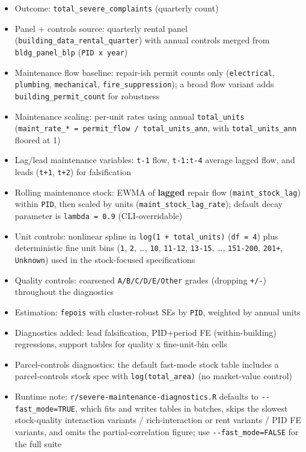 \documentclass[
  11pt,
]{article}
\providecommand{\tightlist}{%
  \setlength{\itemsep}{0pt}\setlength{\parskip}{0pt}}
\begin{document}
\begin{itemize}
\tightlist
\item
  Outcome: \texttt{total\_severe\_complaints} (quarterly count)
\item
  Panel + controls source: quarterly rental panel
  (\texttt{building\_data\_rental\_quarter}) with annual controls merged
  from \texttt{bldg\_panel\_blp} (\texttt{PID\ x\ year})
\item
  Maintenance flow baseline: repair-ish permit counts only
  (\texttt{electrical}, \texttt{plumbing}, \texttt{mechanical},
  \texttt{fire\_suppression}); a broad flow variant adds
  \texttt{building\_permit\_count} for robustness
\item
  Maintenance scaling: per-unit rates using annual \texttt{total\_units}
  (\texttt{maint\_rate\_*\ =\ permit\_flow\ /\ total\_units\_ann}, with
  \texttt{total\_units\_ann} floored at 1)
\item
  Lag/lead maintenance variables: \texttt{t-1} flow, \texttt{t-1:t-4}
  average lagged flow, and leads (\texttt{t+1}, \texttt{t+2}) for
  falsification
\item
  Rolling maintenance stock: EWMA of \textbf{lagged} repair flow
  (\texttt{maint\_stock\_lag}) within \texttt{PID}, then scaled by units
  (\texttt{maint\_stock\_lag\_rate}); default decay parameter is
  \texttt{lambda\ =\ 0.9} (CLI-overridable)
\item
  Unit controls: nonlinear spline in \texttt{log(1\ +\ total\_units)}
  (\texttt{df\ =\ 4}) plus deterministic fine unit bins (\texttt{1},
  \texttt{2}, \ldots, \texttt{10}, \texttt{11-12}, \texttt{13-15},
  \ldots, \texttt{151-200}, \texttt{201+}, \texttt{Unknown}) used in the
  stock-focused specifications
\item
  Quality controls: coarsened \texttt{A/B/C/D/E/Other} grades (dropping
  \texttt{+/-}) throughout the diagnostics
\item
  Estimation: \texttt{fepois} with cluster-robust SEs by \texttt{PID},
  weighted by annual units
\item
  Diagnostics added: lead falsification, PID+period FE (within-building)
  regressions, support tables for quality x fine-unit-bin cells
\item
  Parcel-controls diagnostics: the default fast-mode stock table
  includes a parcel-controls stock spec with \texttt{log(total\_area)}
  (no market-value control)
\item
  Runtime note: \texttt{r/severe-maintenance-diagnostics.R} defaults to
  \texttt{-\/-fast\_mode=TRUE}, which fits and writes tables in batches,
  skips the slowest stock-quality interaction variants /
  rich-interaction or rent variants / PID FE variants, and omits the
  partial-correlation figure; use \texttt{-\/-fast\_mode=FALSE} for the
  full suite
\end{itemize}
\end{document}
